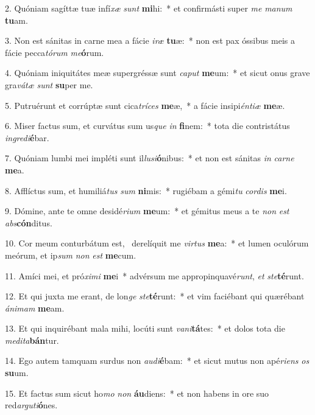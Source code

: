 2. Quóniam sagíttæ tuæ infí\textit{xæ} \textit{sunt} \textbf{mi}hi:~*  et confirmásti super \textit{me} \textit{ma}\textit{num} \textbf{tu}am.\

3. Non est sánitas in carne mea a fácie \textit{i}\textit{ræ} \textbf{tu}æ:~*  non est pax óssibus meis a fácie pecca\textit{tó}\textit{rum} \textit{me}\textbf{ó}rum.\

4. Quóniam iniquitátes meæ supergréssæ sunt \textit{ca}\textit{put} \textbf{me}um:~*  et sicut onus grave gra\textit{vá}\textit{tæ} \textit{sunt} \textbf{su}per me.\

5. Putruérunt et corrúptæ sunt cica\textit{trí}\textit{ces} \textbf{me}æ,~*  a fácie insipi\textit{én}\textit{ti}\textit{æ} \textbf{me}æ.\

6. Miser factus sum, et curvátus sum us\textit{que} \textit{in} \textbf{fi}nem:~*  tota die contristátus \textit{in}\textit{gre}\textit{di}\textbf{é}bar.\

7. Quóniam lumbi mei impléti sunt il\textit{lu}\textit{si}\textbf{ó}nibus:~*  et non est sánitas \textit{in} \textit{car}\textit{ne} \textbf{me}a.\

8. Afflíctus sum, et humiliá\textit{tus} \textit{sum} \textbf{ni}mis:~*  rugiébam a gémi\textit{tu} \textit{cor}\textit{dis} \textbf{me}i.\

9. Dómine, ante te omne desidé\textit{ri}\textit{um} \textbf{me}um:~*  et gémitus meus a te \textit{non} \textit{est} \textit{abs}\textbf{cón}ditus.\

10. Cor meum conturbátum est, \dag\  derelíquit me \textit{vir}\textit{tus} \textbf{me}a:~*  et lumen oculórum meórum, et ip\textit{sum} \textit{non} \textit{est} \textbf{me}cum.\

11. Amíci mei, et pró\textit{xi}\textit{mi} \textbf{me}i~*  advérsum me appropinquavé\textit{runt}, \textit{et} \textit{ste}\textbf{té}runt.\

12. Et qui juxta me erant, de lon\textit{ge} \textit{ste}\textbf{té}runt:~*  et vim faciébant qui quærébant \textit{á}\textit{ni}\textit{mam} \textbf{me}am.\

13. Et qui inquirébant mala mihi, locúti sunt \textit{va}\textit{ni}\textbf{tá}tes:~*  et dolos tota die \textit{me}\textit{di}\textit{ta}\textbf{bán}tur.\

14. Ego autem tamquam surdus non \textit{au}\textit{di}\textbf{é}bam:~*  et sicut mutus non apé\textit{ri}\textit{ens} \textit{os} \textbf{su}um.\

15. Et factus sum sicut ho\textit{mo} \textit{non} \textbf{áu}diens:~*  et non habens in ore suo red\textit{ar}\textit{gu}\textit{ti}\textbf{ó}nes.\

